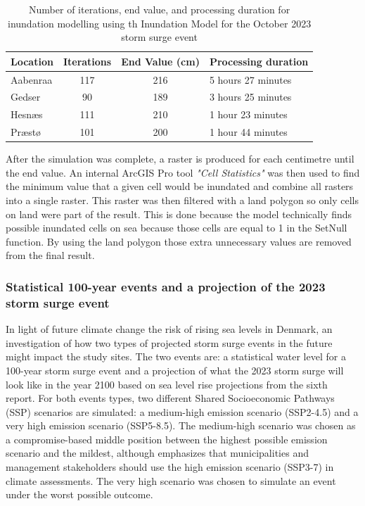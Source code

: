 \begin{table}[H]
	\centering
	\renewcommand{\arraystretch}{1}
	\begin{threeparttable}
		\caption{Number of iterations, end value, and processing duration for inundation modelling using th Inundation Model for the October 2023 storm surge event}
		\begin{tabular}{@{} l 
				S[table-format=7.2, output-decimal-marker={,}] 
				S[table-format=7.2, output-decimal-marker={,}]
				l @{}} 
			\toprule
			\textbf{Location} & \textbf{Iterations} & \textbf{End Value (cm)}  & \textbf{Processing duration}\\
			\midrule
			Aabenraa & 117 & 216 & 5 hours 27 minutes \\
			Gedser & 90 & 189 & 3  hours 25 minutes\\ 
			Hesnæs & 111 & 210 & 1 hour 23 minutes \\
			Præstø & 101 & 200 & 1 hour 44 minutes \\
			\bottomrule
		\end{tabular}
		\label{Tabel: Antal iterationer og slutværdier for Inundation Model}
	\end{threeparttable}
\end{table}
After the simulation was complete, a raster is produced for each centimetre until the end value. An internal ArcGIS Pro tool \textit{"Cell Statistics"} was then used to find the minimum value that a given cell would be inundated and combine all rasters into a single raster. This raster was then filtered with a land polygon so only cells on land were part of the result. This is done because the model technically finds possible inundated cells on sea because those cells are equal to 1 in the SetNull function. By using the land polygon those extra unnecessary values are removed from the final result.\\

\subsubsection{Statistical 100-year events and a projection of the 2023 storm surge event}
In light of future climate change the risk of rising sea levels in Denmark, an investigation of how two types of projected storm surge events in the future might impact the study sites. The two events are: a statistical water level for a 100-year storm surge event and a projection of what the 2023 storm surge will look like in the year 2100 based on sea level rise projections from the sixth \cite{ipcc_report_AR6} report. For both events types, two different Shared Socioeconomic Pathways (SSP) scenarios are simulated: a medium-high emission scenario (SSP2-4.5) and a very high emission scenario (SSP5-8.5). The medium-high scenario was chosen as a compromise-based middle position between the highest possible emission scenario and the mildest, although \cite{dmi_ny_nodate} emphasizes that municipalities and management stakeholders should use the high emission scenario (SSP3-7) in climate assessments. The very high scenario was chosen to simulate an event under the worst possible outcome.\\ 

